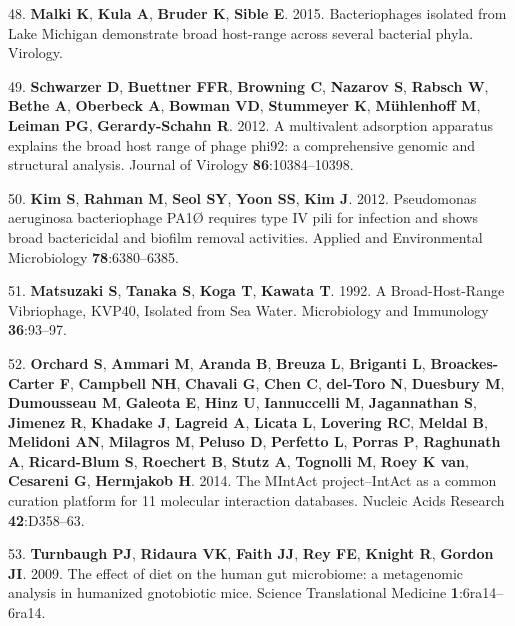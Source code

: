 \documentclass[12pt,]{article}
\begin{document}
\hypertarget{ref-Malki:2015tm}{}
48. \textbf{Malki K}, \textbf{Kula A}, \textbf{Bruder K}, \textbf{Sible
E}. 2015. Bacteriophages isolated from Lake Michigan demonstrate broad
host-range across several bacterial phyla. Virology.

\hypertarget{ref-Schwarzer:2012ez}{}
49. \textbf{Schwarzer D}, \textbf{Buettner FFR}, \textbf{Browning C},
\textbf{Nazarov S}, \textbf{Rabsch W}, \textbf{Bethe A},
\textbf{Oberbeck A}, \textbf{Bowman VD}, \textbf{Stummeyer K},
\textbf{Mühlenhoff M}, \textbf{Leiman PG}, \textbf{Gerardy-Schahn R}.
2012. A multivalent adsorption apparatus explains the broad host range
of phage phi92: a comprehensive genomic and structural analysis. Journal
of Virology \textbf{86}:10384--10398.

\hypertarget{ref-Kim:2012dh}{}
50. \textbf{Kim S}, \textbf{Rahman M}, \textbf{Seol SY}, \textbf{Yoon
SS}, \textbf{Kim J}. 2012. Pseudomonas aeruginosa bacteriophage PA1Ø
requires type IV pili for infection and shows broad bactericidal and
biofilm removal activities. Applied and Environmental Microbiology
\textbf{78}:6380--6385.

\hypertarget{ref-Matsuzaki:1992gw}{}
51. \textbf{Matsuzaki S}, \textbf{Tanaka S}, \textbf{Koga T},
\textbf{Kawata T}. 1992. A Broad-Host-Range Vibriophage, KVP40, Isolated
from Sea Water. Microbiology and Immunology \textbf{36}:93--97.

\hypertarget{ref-Orchard:2014hq}{}
52. \textbf{Orchard S}, \textbf{Ammari M}, \textbf{Aranda B},
\textbf{Breuza L}, \textbf{Briganti L}, \textbf{Broackes-Carter F},
\textbf{Campbell NH}, \textbf{Chavali G}, \textbf{Chen C},
\textbf{del-Toro N}, \textbf{Duesbury M}, \textbf{Dumousseau M},
\textbf{Galeota E}, \textbf{Hinz U}, \textbf{Iannuccelli M},
\textbf{Jagannathan S}, \textbf{Jimenez R}, \textbf{Khadake J},
\textbf{Lagreid A}, \textbf{Licata L}, \textbf{Lovering RC},
\textbf{Meldal B}, \textbf{Melidoni AN}, \textbf{Milagros M},
\textbf{Peluso D}, \textbf{Perfetto L}, \textbf{Porras P},
\textbf{Raghunath A}, \textbf{Ricard-Blum S}, \textbf{Roechert B},
\textbf{Stutz A}, \textbf{Tognolli M}, \textbf{Roey K van},
\textbf{Cesareni G}, \textbf{Hermjakob H}. 2014. The MIntAct
project--IntAct as a common curation platform for 11 molecular
interaction databases. Nucleic Acids Research \textbf{42}:D358--63.

\hypertarget{ref-Turnbaugh:2009hf}{}
53. \textbf{Turnbaugh PJ}, \textbf{Ridaura VK}, \textbf{Faith JJ},
\textbf{Rey FE}, \textbf{Knight R}, \textbf{Gordon JI}. 2009. The effect
of diet on the human gut microbiome: a metagenomic analysis in humanized
gnotobiotic mice. Science Translational Medicine
\textbf{1}:6ra14--6ra14.
\end{document}
